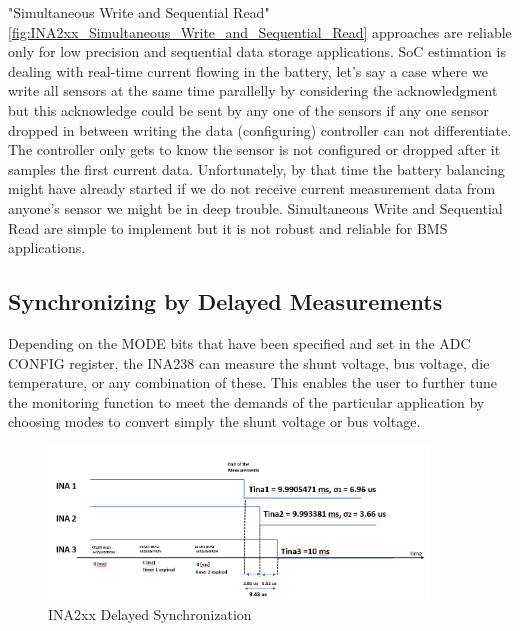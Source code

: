 "Simultaneous Write and Sequential Read" \ref{fig:INA2xx_Simultaneous_Write_and_Sequential_Read} approaches are reliable only for low precision and sequential data storage applications. SoC estimation is dealing with real-time current flowing in the battery, let's say a case where we write all sensors at the same time parallelly by considering the acknowledgment but this acknowledge could be sent by any one of the sensors if any one sensor dropped in between writing the data (configuring) controller can not differentiate. The controller only gets to know the sensor is not configured or dropped after it samples the first current data. Unfortunately, by that time the battery balancing might have already started if we do not receive current measurement data from anyone's sensor we might be in deep trouble. Simultaneous Write and Sequential Read are simple to implement but it is not robust and reliable for BMS applications.

\subsection{Synchronizing by Delayed Measurements  }
Depending on the MODE bits that have been specified and set in the ADC CONFIG register, the INA238 can measure the shunt voltage, bus voltage, die temperature, or any combination of these. This enables the user to further tune the monitoring function to meet the demands of the particular application by choosing modes to convert simply the shunt voltage or bus voltage.
\begin{figure}
    \centering
    \includegraphics[width=0.9\textwidth]{Chap05/Figures/INA_synchronization_alert.PNG}
    \caption{INA2xx Delayed Synchronization}
    \label{fig:INA_synchronization_alert}
\end{figure}


